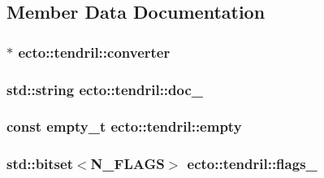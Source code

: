 \subsection{Member Data Documentation}
\hypertarget{classecto_1_1tendril_ac4d6bcc7c0f82c7017a9e0c53a942121}{
\subsubsection[{converter}]{$\ast$ ecto\-::tendril\-::converter\hspace{0.3cm}{\ttfamily [private]}}}\label{classecto_1_1tendril_ac4d6bcc7c0f82c7017a9e0c53a942121}
\hypertarget{classecto_1_1tendril_a6e8304d03aa8a24be843d3bb8d26332d}{
\subsubsection[{doc\-\_\-}]{\setlength{\rightskip}{0pt plus 5cm}std\-::string ecto\-::tendril\-::doc\-\_\-\hspace{0.3cm}{\ttfamily [private]}}}\label{classecto_1_1tendril_a6e8304d03aa8a24be843d3bb8d26332d}
\hypertarget{classecto_1_1tendril_ab8098c05197f972a821c8b094b9a6010}{
\subsubsection[{empty}]{\setlength{\rightskip}{0pt plus 5cm}const {\bf empty\-\_\-t} ecto\-::tendril\-::empty\hspace{0.3cm}{\ttfamily [static]}}}\label{classecto_1_1tendril_ab8098c05197f972a821c8b094b9a6010}
\hypertarget{classecto_1_1tendril_a7b2a11ba7c80606fafda80d34b0a1bfe}{
\subsubsection[{flags\-\_\-}]{\setlength{\rightskip}{0pt plus 5cm}std\-::bitset$<${\bf N\-\_\-\-F\-L\-A\-G\-S}$>$ ecto\-::tendril\-::flags\-\_\-\hspace{0.3cm}{\ttfamily [private]}}}\label{classecto_1_1tendril_a7b2a11ba7c80606fafda80d34b0a1bfe}
